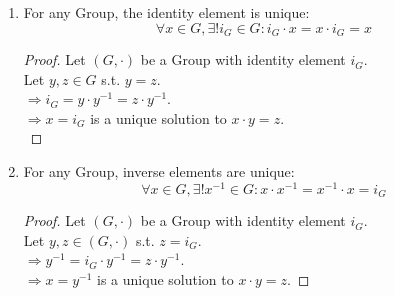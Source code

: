 \documentclass{article}
\begin{document}
\begin{enumerate}
				\item For any Group, the identity element is unique:
				$$\forall x \in G, \exists ! i_G \in G: i_G \cdot x = x \cdot i_G = x$$
				\begin{proof}
					Let $(G, \cdot)$ be a Group with identity element $i_G$.\\
					Let $y, z \in G$ s.t. $y = z$.\\
					$\Rightarrow i_G = y \cdot y^{-1} = z \cdot y^{-1}$.\\
					$\Rightarrow x = i_G$ is a unique solution to $x \cdot y = z$.\\
				\end{proof}

				\item For any Group, inverse elements are unique:
				$$\forall x \in G, \exists ! x^{-1} \in G: x \cdot x^{-1} = x^{-1} \cdot x = i_G$$
				\begin{proof}
					Let $(G, \cdot)$ be a Group with identity element $i_G$.\\
					Let $y, z \in (G, \cdot)$ s.t. $z = i_G$.\\
					$\Rightarrow y^{-1} = i_G \cdot y^{-1} = z \cdot y^{-1}$.\\
					$\Rightarrow x = y^{-1}$ is a unique solution to $x \cdot y = z$.
				\end{proof}


\end{enumerate}
\end{document}
